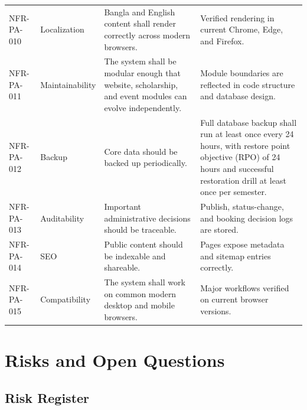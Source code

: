 \documentclass[12pt,a4paper]{article}
\begin{document}
\begin{longtable}{@{}L{2.1cm}L{2.5cm}L{6.4cm}L{3.1cm}@{}}
NFR-PA-010 & Localization & Bangla and English content shall render correctly across modern browsers. & Verified rendering in current Chrome, Edge, and Firefox. \\
NFR-PA-011 & Maintainability & The system shall be modular enough that website, scholarship, and event modules can evolve independently. & Module boundaries are reflected in code structure and database design. \\
NFR-PA-012 & Backup & Core data should be backed up periodically. & Full database backup shall run at least once every 24 hours, with restore point objective (RPO) of 24 hours and successful restoration drill at least once per semester. \\
NFR-PA-013 & Auditability & Important administrative decisions should be traceable. & Publish, status-change, and booking decision logs are stored. \\
NFR-PA-014 & SEO & Public content should be indexable and shareable. & Pages expose metadata and sitemap entries correctly. \\
NFR-PA-015 & Compatibility & The system shall work on common modern desktop and mobile browsers. & Major workflows verified on current browser versions. \\
\bottomrule
\end{longtable}

\section{Risks and Open Questions}

\subsection{Risk Register}
\end{document}
